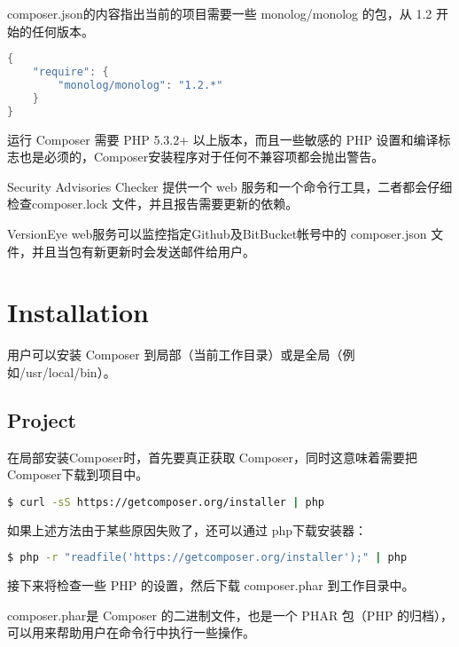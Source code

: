 composer.json的内容指出当前的项目需要一些 monolog/monolog 的包，从 1.2 开始的任何版本。

\begin{lstlisting}[language=Java]
{
    "require": {
        "monolog/monolog": "1.2.*"
    }
}
\end{lstlisting}

运行 Composer 需要 PHP 5.3.2+ 以上版本，而且一些敏感的 PHP 设置和编译标志也是必须的，Composer安装程序对于任何不兼容项都会抛出警告。



\begin{compactitem}
\item Security Advisories Checker 提供一个 web 服务和一个命令行工具，二者都会仔细检查composer.lock 文件，并且报告需要更新的依赖。
\item VersionEye web服务可以监控指定Github及BitBucket帐号中的 composer.json 文件，并且当包有新更新时会发送邮件给用户。
\end{compactitem}






\section{Installation}

用户可以安装 Composer 到局部（当前工作目录）或是全局（例如/usr/local/bin）。

\subsection{Project}

在局部安装Composer时，首先要真正获取 Composer，同时这意味着需要把Composer下载到项目中。

\begin{lstlisting}[language=bash]
$ curl -sS https://getcomposer.org/installer | php
\end{lstlisting}

如果上述方法由于某些原因失败了，还可以通过 php下载安装器：

\begin{lstlisting}[language=bash]
$ php -r "readfile('https://getcomposer.org/installer');" | php
\end{lstlisting}

接下来将检查一些 PHP 的设置，然后下载 composer.phar 到工作目录中。

composer.phar是 Composer 的二进制文件，也是一个 PHAR 包（PHP 的归档），可以用来帮助用户在命令行中执行一些操作。

